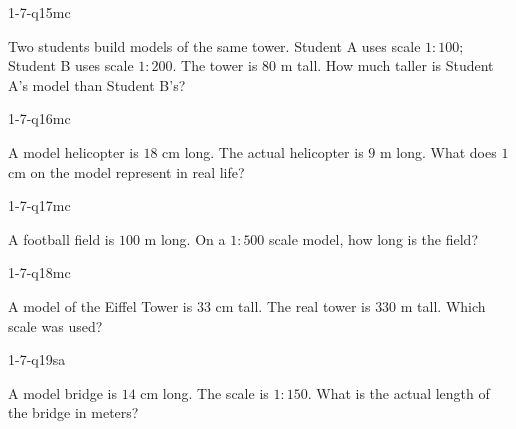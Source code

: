\begin{practiceQuestion}{1-7-q15}{mc}
\begin{questionText}
Two students build models of the same tower. Student A uses scale $1 : 100$; Student B uses scale $1 : 200$. The tower is $80$ m tall. How much taller is Student A's model than Student B's?
\end{questionText}
\end{practiceQuestion}

\begin{practiceQuestion}{1-7-q16}{mc}
\begin{questionText}
A model helicopter is $18$ cm long. The actual helicopter is $9$ m long. What does $1$ cm on the model represent in real life?
\end{questionText}
\end{practiceQuestion}

\begin{practiceQuestion}{1-7-q17}{mc}
\begin{questionText}
A football field is $100$ m long. On a $1 : 500$ scale model, how long is the field?
\end{questionText}
\end{practiceQuestion}

\begin{practiceQuestion}{1-7-q18}{mc}
\begin{questionText}
A model of the Eiffel Tower is $33$ cm tall. The real tower is $330$ m tall. Which scale was used?
\end{questionText}
\end{practiceQuestion}


\begin{practiceQuestion}{1-7-q19}{sa}
\begin{questionText}
A model bridge is $14$ cm long. The scale is $1 : 150$. What is the actual length of the bridge in meters?
\end{questionText}
\end{practiceQuestion}


